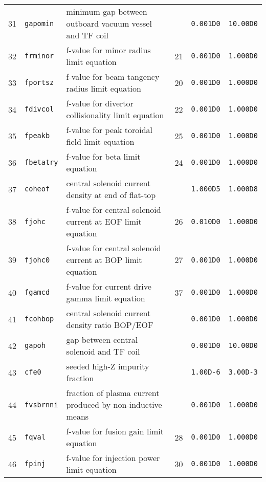 \documentclass[11pt,a4paper]{report}
\begin{document}
\begin{table}[tbph]
\begin{center}
\begin{tabular}{||c|l|l|c|c|c||}
31  & \texttt{gapomin}  & minimum gap between outboard vacuum vessel and TF coil &     & \texttt{0.001D0} & \texttt{10.00D0} \\
32  & \texttt{frminor}  & f-value for minor radius limit equation       & 21  & \texttt{0.001D0} & \texttt{1.000D0} \\
33  & \texttt{fportsz}  & f-value for beam tangency radius limit equation & 20  & \texttt{0.001D0} & \texttt{1.000D0} \\
34  & \texttt{fdivcol}  & f-value for divertor collisionality limit equation & 22  & \texttt{0.001D0} & \texttt{1.000D0} \\
35  & \texttt{fpeakb}   & f-value for peak toroidal field limit equation & 25  & \texttt{0.001D0} & \texttt{1.000D0} \\
36  & \texttt{fbetatry} & f-value for beta limit equation               & 24  & \texttt{0.001D0} & \texttt{1.000D0} \\
37  & \texttt{coheof}   & central solenoid current density at end of flat-top &     & \texttt{1.000D5} & \texttt{1.000D8} \\
38  & \texttt{fjohc}    & f-value for central solenoid current at EOF limit equation & 26  & \texttt{0.010D0} & \texttt{1.000D0} \\
39  & \texttt{fjohc0}   & f-value for central solenoid current at BOP limit equation & 27  & \texttt{0.001D0} & \texttt{1.000D0} \\
40  & \texttt{fgamcd}   & f-value for current drive gamma limit equation & 37  & \texttt{0.001D0} & \texttt{1.000D0} \\
41  & \texttt{fcohbop}  & central solenoid current density ratio BOP/EOF &     & \texttt{0.001D0} & \texttt{1.000D0} \\
42  & \texttt{gapoh}    & gap between central solenoid and TF coil      &     & \texttt{0.001D0} & \texttt{10.00D0} \\
43  & \texttt{cfe0}     & seeded high-Z impurity fraction               &     & \texttt{1.00D-6} & \texttt{3.00D-3} \\
44  & \texttt{fvsbrnni} & fraction of plasma current produced by non-inductive means &     & \texttt{0.001D0} & \texttt{1.000D0} \\
45  & \texttt{fqval}    & f-value for fusion gain limit equation        & 28  & \texttt{0.001D0} & \texttt{1.000D0} \\
46  & \texttt{fpinj}    & f-value for injection power limit equation    & 30  & \texttt{0.001D0} & \texttt{1.000D0} \\

\end{tabular}
\end{center}
\end{table}
\end{document}

